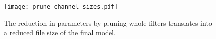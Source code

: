 \begin{figure}[!htbp]
	\texttt{[image: prune-channel-sizes.pdf]}
	\centering
	\caption[Reduction in model size by channel pruning]{The reduction in parameters by pruning whole filters translates into a reduced file size of the final model.}
    \label{fig:prune:channel-size}
\end{figure}
